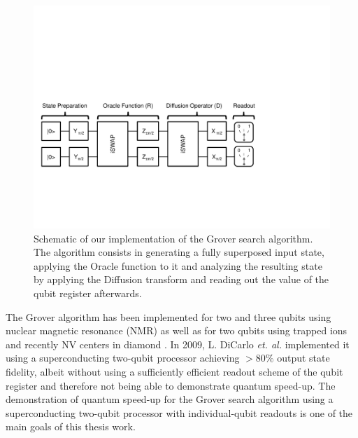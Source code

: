 \begin{figure}[ht!]
	\centering
		\includegraphics[width=\textwidth]{./material/papers/grover/grover_algorithm}
	\caption{Schematic of our implementation of the Grover search algorithm. The algorithm consists in generating a fully superposed input state, applying the Oracle function to it and analyzing the resulting state by applying the Diffusion transform and reading out the value of the qubit register afterwards.}
	\label{fig:GroverAlgorithmSchematic}
\end{figure}

The Grover algorithm has been implemented for two and three qubits using nuclear magnetic resonance (NMR) \citep{chuang_experimental_1998,vandersypen_implementation_2000} as well as for two qubits using trapped ions \citep{brickman_implementation_2005} and recently NV centers in diamond \citep{sar_decoherence-protected_2012}. In 2009, L. DiCarlo {\it et. al.} implemented it using a superconducting two-qubit processor \citep{dicarlo_demonstration_2009} achieving $>80 \%$ output state fidelity, albeit without using a sufficiently efficient readout scheme of the qubit register and therefore not being able to demonstrate quantum speed-up. The demonstration of quantum speed-up for the Grover search algorithm using a superconducting two-qubit processor with individual-qubit readouts is one of the main goals of this thesis work.

\smallskip

